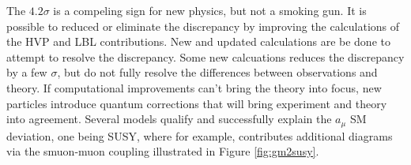 
The $4.2\sigma$  is a compeling sign for new physics, but not a smoking gun. It is possible to reduced or eliminate the discrepancy by improving the calculations of the HVP and LBL contributions. New and updated calculations are be done to attempt to resolve the discrepancy. Some new calcuations reduces the discrepancy by a few $\sigma$, but do not fully resolve the differences between observations and theory. If computational improvements can't bring the theory into focus, new particles introduce  quantum corrections that will bring experiment and theory into agreement. Several models qualify and successfully explain the $a_\mu$ SM deviation, one being SUSY, where for example, contributes additional diagrams via the smuon-muon coupling illustrated in Figure \ref{fig:gm2susy}.

